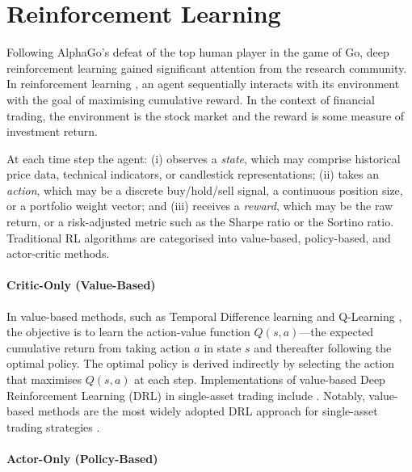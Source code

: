 \documentclass[12pt, a4paper]{report}
\begin{document}
\section{Reinforcement Learning}
\label{sec:rl}

Following AlphaGo's \cite{silver2016mastering} defeat of the top human player in the game
of Go, deep reinforcement learning gained significant attention from the research community.
In reinforcement learning \cite{sutton2018rl}, an agent sequentially interacts with its
environment with the goal of maximising cumulative reward. In the context of financial
trading, the environment is the stock market and the reward is some measure of investment
return.

At each time step the agent: (i) observes a \emph{state}, which may comprise historical
price data, technical indicators, or candlestick representations; (ii) takes an
\emph{action}, which may be a discrete buy/hold/sell signal, a continuous position size, or
a portfolio weight vector; and (iii) receives a \emph{reward}, which may be the raw return,
or a risk-adjusted metric such as the Sharpe ratio or the Sortino ratio. Traditional RL
algorithms are categorised into value-based, policy-based, and actor-critic methods.

\paragraph{Critic-Only (Value-Based)}
\label{sec:value-based}

In value-based methods, such as Temporal Difference learning \cite{sutton1988td} and
Q-Learning \cite{watkins1992qlearning}, the objective is to learn the action-value function
$Q(s, a)$---the expected cumulative return from taking action $a$ in state $s$ and thereafter
following the optimal policy. The optimal policy is derived indirectly by selecting the
action that maximises $Q(s, a)$ at each step. Implementations of value-based Deep
Reinforcement Learning (DRL) in single-asset trading include
\cite{carta2021,huang2023drl,taghian2022,theate2021,ye2023}.
Notably, value-based methods are the most widely adopted DRL approach for single-asset
trading strategies \cite{huang2024novel}.

\paragraph{Actor-Only (Policy-Based)}
\label{sec:policy-based}
\end{document}
